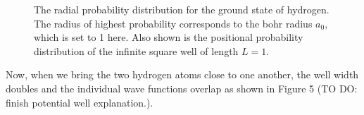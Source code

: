 \documentclass{article}
\begin{document}
\begin{figure}[h]
\centering
{}%
\qquad
{}%
\caption{The radial probability distribution for the ground state of hydrogen. The radius of highest probability corresponds to the bohr radius $a_{0}$, which is set to 1 here. Also
shown is the positional probability distribution of the infinite square well of length $L = 1$.}
\end{figure}

Now, when we bring the two hydrogen atoms close to one another, the well width doubles and the individual wave functions overlap as shown in Figure 5 (TO DO: finish potential well explanation.). \par
\end{document}
